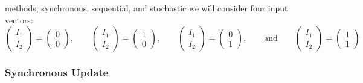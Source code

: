 methods, synchronous, sequential, and stochastic we will consider four input 
vectors:
\begin{equation*}
\begin{pmatrix}
I_1 \\ I_2
\end{pmatrix}
= 
\begin{pmatrix}
0 \\ 0
\end{pmatrix}, \qquad 
\begin{pmatrix}
I_1 \\ I_2
\end{pmatrix}
= 
\begin{pmatrix}
1 \\ 0
\end{pmatrix}, \qquad 
\begin{pmatrix}
I_1 \\ I_2
\end{pmatrix}
= 
\begin{pmatrix}
0 \\ 1
\end{pmatrix}, \qquad 
\mbox{and}  \qquad 
\begin{pmatrix}
I_1 \\ I_2
\end{pmatrix}
= 
\begin{pmatrix}
1 \\ 1
\end{pmatrix}
\end{equation*}

\subsubsection{Synchronous Update} 

